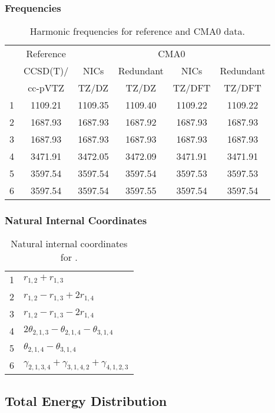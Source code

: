 \documentclass[10pt,oneside]{article}
\begin{document}
\begin{table}[h!]
\subsubsection*{Frequencies}
\centering
\caption{Harmonic frequencies for reference and CMA0 data.}
\begin{tabular}{cccccc}
\toprule
{} & Reference & \multicolumn{4}{c}{CMA0} \\
{} &  CCSD(T)/ &    NICs &  Redundant &    NICs & Redundant \\
{} &   cc-pVTZ &   TZ/DZ &      TZ/DZ &  TZ/DFT &    TZ/DFT \\
\midrule
1 &   1109.21 & 1109.35 &    1109.40 & 1109.22 &   1109.22 \\
2 &   1687.93 & 1687.93 &    1687.92 & 1687.93 &   1687.93 \\
3 &   1687.93 & 1687.93 &    1687.93 & 1687.93 &   1687.93 \\
4 &   3471.91 & 3472.05 &    3472.09 & 3471.91 &   3471.91 \\
5 &   3597.54 & 3597.54 &    3597.54 & 3597.53 &   3597.53 \\
6 &   3597.54 & 3597.54 &    3597.55 & 3597.54 &   3597.54 \\
\bottomrule
\end{tabular}
\end{table}

\begin{table}[h!]
\subsubsection*{Natural Internal Coordinates}
\centering
\caption{Natural internal coordinates for .}
\small
\begin{tabular}{ll}
\toprule
  1   & $r_{1,2} + r_{1,3}$ \\
  2   & $r_{1,2} - r_{1,3} + 2r_{1,4}$ \\
  3   & $r_{1,2} - r_{1,3} - 2r_{1,4}$ \\
  4   & $2\theta_{2,1,3} - \theta_{2,1,4} - \theta_{3,1,4}$ \\
  5   & $\theta_{2,1,4} - \theta_{3,1,4}$ \\
  6   & $\gamma_{2,1,3,4} + \gamma_{3,1,4,2} + \gamma_{4,1,2,3}$ \\
\bottomrule
\end{tabular}
\end{table}

\begin{table}
\subsection*{Total Energy Distribution}
\centering\end{table}
\end{document}

